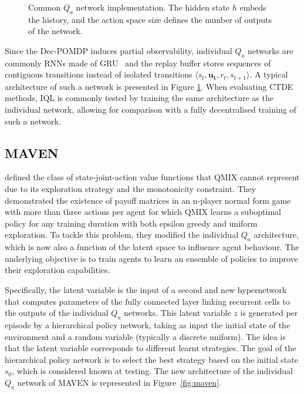 \begin{figure}
    \centering

\caption{Common $Q_a$ network implementation. The hidden state $h$ embeds the history, and the action space size defines the number of outputs of the network.}
\label{fig:ch3_indivQ}
\end{figure}

Since the Dec-POMDP induces partial observability, individual $Q_a$ networks are commonly RNNs made of GRU~\citep{Chung2014EmpiricalModeling} and the replay buffer stores sequences of contiguous transitions instead of isolated transitions $\langle s_{t},\mathbf{u_{t}},r_{t},s_{t+1}\rangle$.
A typical architecture of such a network is presented in Figure \ref{fig:ch3_indivQ}.
When evaluating CTDE methods, IQL is commonly tested by training the same architecture as the individual network, allowing for comparison with a fully decentralised training of such a network.

\subsection{MAVEN}
\citet{Mahajan2019MAVEN:Exploration} defined the class of state-joint-action value functions that QMIX cannot represent due to its exploration strategy and the monotonicity constraint.
They demonstrated the existence of payoff matrices in an n-player normal form game with more than three actions per agent for which QMIX learns a suboptimal policy for any training duration with both epsilon greedy and uniform exploration.
To tackle this problem, they modified the individual $Q_a$ architecture, which is now also a function of the latent space to influence agent behaviour.
The underlying objective is to train agents to learn an ensemble of policies to improve their exploration capabilities.

Specifically, the latent variable is the input of a second and new hypernetwork that computes parameters of the fully connected layer linking recurrent cells to the outputs of the individual $Q_a$ networks.
This latent variable $z$ is generated per episode by a hierarchical policy network, taking as input the initial state of the environment and a random variable (typically a discrete uniform).
The idea is that the latent variable corresponds to different learnt strategies.
The goal of the hierarchical policy network is to select the best strategy based on the initial state $s_0$, which is considered known at testing.
The new architecture of the individual $Q_a$ network of MAVEN is represented in Figure~\ref{fig:maven}.

